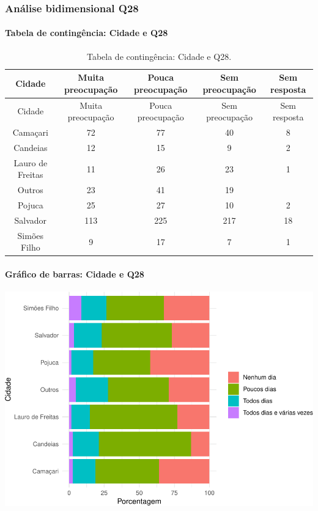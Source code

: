 \documentclass[]{article}
\let\oldparagraph\paragraph
\renewcommand{\paragraph}[1]{\oldparagraph{#1}\mbox{}}
\begin{document}
\cleardoublepage

\hypertarget{anuxe1lise-bidimensional-q28}{%
\subsubsection{Análise bidimensional Q28}\label{anuxe1lise-bidimensional-q28}}

\hypertarget{tabela-de-continguxeancia-cidade-e-q28}{%
\paragraph{Tabela de contingência: Cidade e Q28}\label{tabela-de-continguxeancia-cidade-e-q28}}

\begin{longtable}[]{@{}ccccc@{}}
\caption{\label{tab:unnamed-chunk-838}Tabela de contingência: Cidade e Q28.}\tabularnewline
\toprule
Cidade & Muita preocupação & Pouca preocupação & Sem preocupação & Sem resposta\tabularnewline
\midrule
\endfirsthead
\toprule
Cidade & Muita preocupação & Pouca preocupação & Sem preocupação & Sem resposta\tabularnewline
\midrule
\endhead
Camaçari & 72 & 77 & 40 & 8\tabularnewline
Candeias & 12 & 15 & 9 & 2\tabularnewline
Lauro de Freitas & 11 & 26 & 23 & 1\tabularnewline
Outros & 23 & 41 & 19 &\tabularnewline
Pojuca & 25 & 27 & 10 & 2\tabularnewline
Salvador & 113 & 225 & 217 & 18\tabularnewline
Simões Filho & 9 & 17 & 7 & 1\tabularnewline
\bottomrule
\end{longtable}

\hypertarget{gruxe1fico-de-barras-cidade-e-q28}{%
\paragraph{Gráfico de barras: Cidade e Q28}\label{gruxe1fico-de-barras-cidade-e-q28}}

\begin{center}\includegraphics[width=0.75\linewidth]{relatorio_covid19_files/figure-latex/unnamed-chunk-839-1} \end{center}
\end{document}
